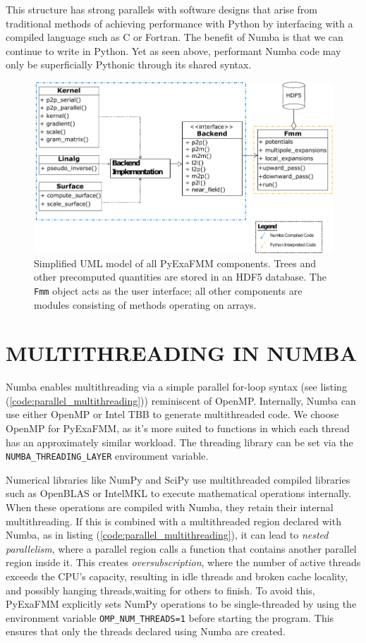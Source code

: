 \documentclass{IEEEcsmag}
\begin{document}
This structure has strong parallels with software designs that arise from traditional methods of achieving performance with Python by interfacing with a compiled language such as C or Fortran. The benefit of Numba is that we can continue to write in Python. Yet as seen above, performant Numba code may only be superficially Pythonic through its shared syntax.

\begin{figure}
    \centerline{\includegraphics {figures/software.pdf}}
    \caption{Simplified UML model of all PyExaFMM components. Trees and other precomputed quantities are stored in an HDF5 database. The \texttt{Fmm} object acts as the user interface; all other components are modules consisting of methods operating on arrays.}
    \label{fig:design}
\end{figure}

\section{MULTITHREADING IN NUMBA}

Numba enables multithreading via a simple parallel for-loop syntax (see listing (\ref{code:parallel_multithreading})) reminiscent of OpenMP. Internally, Numba can use either OpenMP or Intel TBB to generate multithreaded code. We choose OpenMP for PyExaFMM, as it's more suited to functions in which each thread has an approximately similar workload. The threading library can be set via the \lstinline{NUMBA_THREADING_LAYER} environment variable.

Numerical libraries like NumPy and SciPy use multithreaded compiled libraries such as OpenBLAS or IntelMKL to execute mathematical operations internally. When these operations are compiled with Numba, they retain their internal multithreading. If this is combined with a multithreaded region declared with Numba, as in listing (\ref{code:parallel_multithreading}), it can lead to \emph{nested parallelism}, where a parallel region calls a function that contains another parallel region inside it.
This creates \emph{oversubscription}, where the number of active threads exceeds the CPU's capacity, resulting in idle threads and broken cache locality, and possibly hanging threads,waiting for others to finish. To avoid this, PyExaFMM explicitly sets NumPy operations to be single-threaded by using the environment variable \lstinline{OMP_NUM_THREADS=1} before starting the program. This ensures that only the threads declared using Numba are created.
\end{document}
